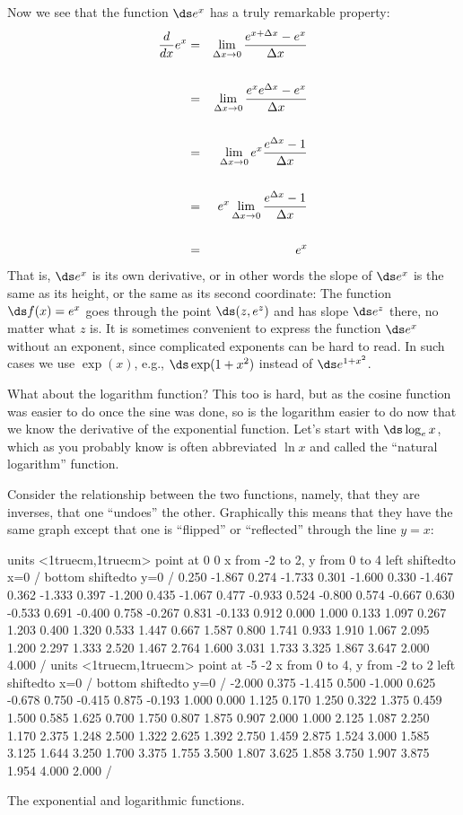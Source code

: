 Now we see that the function $\ds e^x$ has a truly remarkable property:
\begin{eqnarray*}
{d\over dx}e^x&=&\lim_{\Delta x\to 0} {e^{x+\Delta x}-e^x\over \Delta x}\cr\\
&=&\lim_{\Delta x\to 0} {e^xe^{\Delta x}-e^x\over \Delta x}\cr\\
&=&\lim_{\Delta x\to 0} e^x{e^{\Delta x}-1\over \Delta x}\cr\\
&=&e^x\lim_{\Delta x\to 0} {e^{\Delta x}-1\over \Delta x}\cr\\
&=&e^x\cr
\end{eqnarray*}
That is, $\ds e^x$ is its own derivative, or in other words the
slope of $\ds e^x$ is the same as its height, or the same as its second
coordinate: The function $\ds f(x)=e^x$ goes through the point $\ds (z,e^z)$
and has slope $\ds e^z$ there, no matter what $z$ is. It is sometimes
convenient to express the function $\ds e^x$ without an exponent, since
complicated exponents can be hard to read. In such cases we use
$\exp(x)$, e.g., $\ds \exp(1+x^2)$ instead of 
$\ds e^{1+x^2}$.

What about the logarithm function? This too is hard, but as the
cosine function was easier to do once the sine was done, so is the
logarithm easier to do now that we know the derivative of the
exponential function. Let's start with $\ds \log_e x$, which as you
probably know is often abbreviated $\ln x$ and called the ``natural
logarithm'' function.

Consider the relationship between the two functions,
namely, that they are inverses, that one ``undoes'' the
other. Graphically this means that they have the same graph except
that one is ``flipped'' or ``reflected'' through the line $y=x$:
\figure[!ht]
\centerline{\vbox{\beginpicture
\normalgraphs
\setcoordinatesystem units <1truecm,1truecm> point at 0 0
\setplotarea x from -2 to 2, y from 0 to 4
\axis left shiftedto x=0 /
\axis bottom shiftedto y=0 /
\setquadratic
{} 0.250 -1.867 0.274 -1.733 0.301 -1.600 0.330 -1.467 0.362 
-1.333 0.397 -1.200 0.435 -1.067 0.477 -0.933 0.524 -0.800 0.574 
-0.667 0.630 -0.533 0.691 -0.400 0.758 -0.267 0.831 -0.133 0.912 
0.000 1.000 0.133 1.097 0.267 1.203 0.400 1.320 0.533 1.447 
0.667 1.587 0.800 1.741 0.933 1.910 1.067 2.095 1.200 2.297 
1.333 2.520 1.467 2.764 1.600 3.031 1.733 3.325 1.867 3.647 
2.000 4.000 /
\setcoordinatesystem units <1truecm,1truecm> point at -5 -2
\setplotarea x from 0 to 4, y from -2 to 2
\axis left shiftedto x=0 /
\axis bottom shiftedto y=0 /
\setquadratic
{} -2.000 0.375 -1.415 0.500 -1.000 0.625 -0.678 0.750 -0.415 
0.875 -0.193 1.000 0.000 1.125 0.170 1.250 0.322 1.375 0.459 
1.500 0.585 1.625 0.700 1.750 0.807 1.875 0.907 2.000 1.000 
2.125 1.087 2.250 1.170 2.375 1.248 2.500 1.322 2.625 1.392 
2.750 1.459 2.875 1.524 3.000 1.585 3.125 1.644 3.250 1.700 
3.375 1.755 3.500 1.807 3.625 1.858 3.750 1.907 3.875 1.954 
4.000 2.000 /
\endpicture}}
\caption{The exponential and logarithmic functions. \label{fig:exponential and log functions}}
\endfigure

